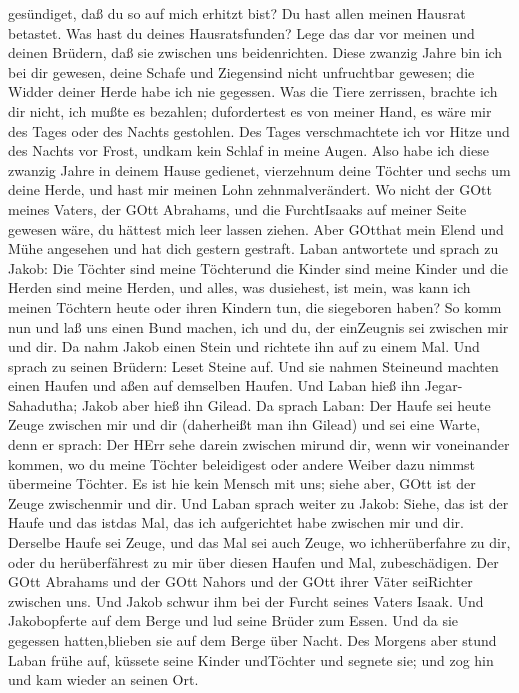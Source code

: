 gesündiget, daß du so auf mich erhitzt bist?  Du hast allen
meinen Hausrat betastet. Was hast du deines Hausratsfunden? Lege das dar
vor meinen und deinen Brüdern, daß sie zwischen uns beidenrichten.
 Diese zwanzig Jahre bin ich bei dir gewesen, deine Schafe
und Ziegensind nicht unfruchtbar gewesen; die Widder deiner Herde habe
ich nie gegessen.  Was die Tiere zerrissen, brachte ich dir
nicht, ich mußte es bezahlen; dufordertest es von meiner Hand, es wäre
mir des Tages oder des Nachts gestohlen.  Des Tages
verschmachtete ich vor Hitze und des Nachts vor Frost, undkam kein
Schlaf in meine Augen.  Also habe ich diese zwanzig Jahre
in deinem Hause gedienet, vierzehnum deine Töchter und sechs um deine
Herde, und hast mir meinen Lohn zehnmalverändert.  Wo nicht
der GOtt meines Vaters, der GOtt Abrahams, und die FurchtIsaaks auf
meiner Seite gewesen wäre, du hättest mich leer lassen ziehen. Aber
GOtthat mein Elend und Mühe angesehen und hat dich gestern gestraft.
 Laban antwortete und sprach zu Jakob: Die Töchter sind
meine Töchterund die Kinder sind meine Kinder und die Herden sind meine
Herden, und alles, was dusiehest, ist mein, was kann ich meinen Töchtern
heute oder ihren Kindern tun, die siegeboren haben?  So
komm nun und laß uns einen Bund machen, ich und du, der einZeugnis sei
zwischen mir und dir.  Da nahm Jakob einen Stein und
richtete ihn auf zu einem Mal.  Und sprach zu seinen
Brüdern: Leset Steine auf. Und sie nahmen Steineund machten einen Haufen
und aßen auf demselben Haufen.  Und Laban hieß ihn
Jegar-Sahadutha; Jakob aber hieß ihn Gilead.  Da sprach
Laban: Der Haufe sei heute Zeuge zwischen mir und dir (daherheißt man
ihn Gilead)  und sei eine Warte, denn er sprach: Der HErr
sehe darein zwischen mirund dir, wenn wir voneinander kommen,
 wo du meine Töchter beleidigest oder andere Weiber dazu
nimmst übermeine Töchter. Es ist hie kein Mensch mit uns; siehe aber,
GOtt ist der Zeuge zwischenmir und dir.  Und Laban sprach
weiter zu Jakob: Siehe, das ist der Haufe und das istdas Mal, das ich
aufgerichtet habe zwischen mir und dir.  Derselbe Haufe sei
Zeuge, und das Mal sei auch Zeuge, wo ichherüberfahre zu dir, oder du
herüberfährest zu mir über diesen Haufen und Mal, zubeschädigen.
 Der GOtt Abrahams und der GOtt Nahors und der GOtt ihrer
Väter seiRichter zwischen uns.  Und Jakob schwur ihm bei
der Furcht seines Vaters Isaak. Und Jakobopferte auf dem Berge und lud
seine Brüder zum Essen. Und da sie gegessen hatten,blieben sie auf dem
Berge über Nacht.  Des Morgens aber stund Laban frühe auf,
küssete seine Kinder undTöchter und segnete sie; und zog hin und kam
wieder an seinen Ort.

